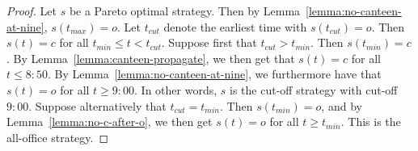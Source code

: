 \begin{proof}
Let $s$ be a Pareto optimal strategy. Then by Lemma~\ref{lemma:no-canteen-at-nine}, $s(t_{max}) = o$. Let $t_{cut}$ denote the earliest time with $s(t_{cut}) = o$. Then $s(t) =c$ for all $t_{min} \leq t < t_{cut}$. Suppose first that $t_{cut} > t_{min}$. Then $s(t_{min}) = c$. By Lemma~\ref{lemma:canteen-propagate}, we then get that $s(t) = c$ for all $t \leq 8{:}50$. By Lemma~\ref{lemma:no-canteen-at-nine}, we furthermore have that $s(t) = o$ for all $t \geq 9{:}00$. In other words, $s$ is the cut-off strategy with cut-off $9{:}00$.  Suppose alternatively that $t_{cut} = t_{min}$. Then $s(t_{min})=o$, and by  Lemma~\ref{lemma:no-c-after-o}, we then get $s(t) = o$ for all $t \geq t_{min}$. This is the all-office strategy. 

\end{proof}
